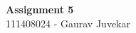 \documentclass[main.tex]{subfiles}
\begin{document}
\begin{titlepage}

\begin{center}
  \LARGE{\bf{Assignment 5\\}}
  \horrule{0.4pt}
  111408024 - Gaurav Juvekar \\
\end{center}
\horrule{0.4pt}
\end{titlepage}
\end{document}
